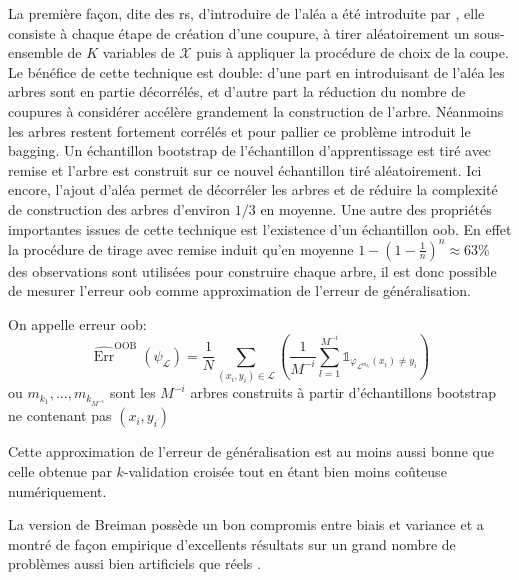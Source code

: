 La première façon, dite des \ac{rs}, d'introduire de l'aléa a été introduite par \citet{Ho1998}, elle consiste à chaque étape de création d'une coupure, à tirer aléatoirement un sous-ensemble de $K$ variables de $\mathcal{X}$ puis à appliquer la procédure de choix de la coupe. Le bénéfice de cette technique est double: d'une part en introduisant de l'aléa les arbres sont en partie décorrélés, et d'autre part la réduction du nombre de coupures à considérer accélère grandement la construction de l'arbre.
Néanmoins les arbres restent fortement corrélés et pour pallier ce problème \citet{Breiman1996} introduit le \ac{bagging}. Un échantillon bootstrap de l'échantillon d'apprentissage est tiré avec remise et l'arbre est construit sur ce nouvel échantillon tiré aléatoirement. Ici encore, l'ajout d'aléa permet de décorréler les arbres et de réduire la complexité de construction des arbres d'environ $1/3$ en moyenne. Une autre des propriétés importantes issues de cette technique est l'existence d'un échantillon \ac{oob}. En effet la procédure de tirage avec remise induit qu'en moyenne $1-\left(1-\frac{1}{n}\right)^n \approx 63\% $ des observations sont utilisées pour construire chaque arbre, il est donc possible de mesurer l'erreur \ac{oob} comme approximation de l'erreur de généralisation.

\begin{definition}
    On appelle erreur \ac{oob}:
    \begin{equation*}
        \hat{\operatorname{Err}}^{\text{OOB}} ( \psi_{\mathcal{L}} ) = \frac{1}{N} \sum_{(x_i,y_i) \in \mathcal{L}} \left( \frac{1}{M^{-i}} \sum_{l=1}^{M^{-i}} \mathds{1}_{\varphi_{\mathcal{L}^{m_{k_l}}} (x_i) \neq y_i} \right)
    \end{equation*}
    ou $m_{k_1},...,m_{k_{M^{-i}}}$ sont les $M^{-i}$ arbres construits à partir d'échantillons bootstrap ne contenant pas $(x_i,y_i)$
\end{definition}

Cette approximation de l'erreur de généralisation est au moins aussi bonne que celle obtenue par $k$-validation croisée \citep{Wolpert1999} tout en étant bien moins coûteuse numériquement.

La version de Breiman possède un bon compromis entre biais et variance et a montré de façon empirique d'excellents résultats sur un grand nombre de problèmes aussi bien artificiels que réels \citep{Fernandez-Delgado2014a}. 

